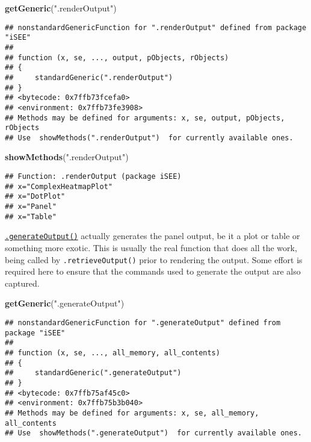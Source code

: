 \documentclass[
]{book}
\newenvironment{Shaded}{\begin{snugshade}}{\end{snugshade}}
\newcommand{\KeywordTok}[1]{\textcolor[rgb]{0.13,0.29,0.53}{\textbf{#1}}}
\newcommand{\NormalTok}[1]{#1}
\newcommand{\StringTok}[1]{\textcolor[rgb]{0.31,0.60,0.02}{#1}}
\begin{document}
\begin{Shaded}
\begin{Highlighting}[]
\KeywordTok{getGeneric}\NormalTok{(}\StringTok{".renderOutput"}\NormalTok{)}
\end{Highlighting}
\end{Shaded}

\begin{verbatim}
## nonstandardGenericFunction for ".renderOutput" defined from package "iSEE"
## 
## function (x, se, ..., output, pObjects, rObjects) 
## {
##     standardGeneric(".renderOutput")
## }
## <bytecode: 0x7ffb73fcefa0>
## <environment: 0x7ffb73fe3908>
## Methods may be defined for arguments: x, se, output, pObjects, rObjects
## Use  showMethods(".renderOutput")  for currently available ones.
\end{verbatim}

\begin{Shaded}
\begin{Highlighting}[]
\KeywordTok{showMethods}\NormalTok{(}\StringTok{".renderOutput"}\NormalTok{)}
\end{Highlighting}
\end{Shaded}

\begin{verbatim}
## Function: .renderOutput (package iSEE)
## x="ComplexHeatmapPlot"
## x="DotPlot"
## x="Panel"
## x="Table"
\end{verbatim}

\href{https://isee.github.io/iSEE/reference/output-generics.html}{\texttt{.generateOutput()}} actually generates the panel output, be it a plot or table or something more exotic.
This is usually the real function that does all the work, being called by \texttt{.retrieveOutput()} prior to rendering the output.
Some effort is required here to ensure that the commands used to generate the output are also captured.

\begin{Shaded}
\begin{Highlighting}[]
\KeywordTok{getGeneric}\NormalTok{(}\StringTok{".generateOutput"}\NormalTok{)}
\end{Highlighting}
\end{Shaded}

\begin{verbatim}
## nonstandardGenericFunction for ".generateOutput" defined from package "iSEE"
## 
## function (x, se, ..., all_memory, all_contents) 
## {
##     standardGeneric(".generateOutput")
## }
## <bytecode: 0x7ffb75af45c0>
## <environment: 0x7ffb75b3b040>
## Methods may be defined for arguments: x, se, all_memory, all_contents
## Use  showMethods(".generateOutput")  for currently available ones.
\end{verbatim}
\end{document}
